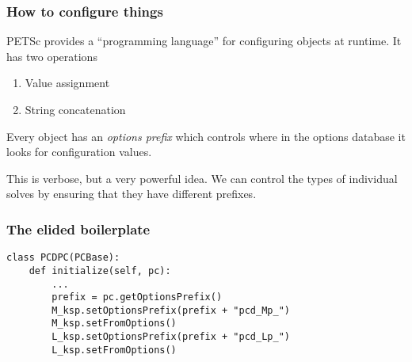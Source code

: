 \documentclass[presentation]{beamer}
\begin{document}
\begin{frame}
  \frametitle{How to configure things}

  PETSc provides a ``programming language'' for configuring objects at
  runtime.  It has two operations

  \begin{enumerate}
  \item Value assignment
  \item String concatenation
  \end{enumerate}

  Every object has an \emph{options prefix} which controls where in
  the options database it looks for configuration values.

  This is verbose, but a very powerful idea.  We can control the types
  of individual solves by ensuring that they have different prefixes.
\end{frame}

\begin{frame}[fragile]
  \frametitle{The elided boilerplate}
\begin{verbatim}
class PCDPC(PCBase):
    def initialize(self, pc):
        ...
        prefix = pc.getOptionsPrefix()
        M_ksp.setOptionsPrefix(prefix + "pcd_Mp_")
        M_ksp.setFromOptions()
        L_ksp.setOptionsPrefix(prefix + "pcd_Lp_")
        L_ksp.setFromOptions()
\end{verbatim}
\end{frame}
\end{document}
